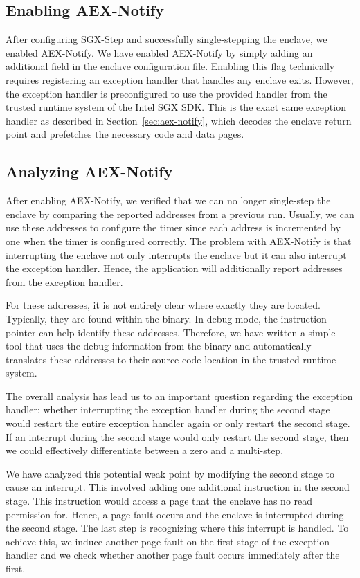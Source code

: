 \documentclass{llncs}
\begin{document}
\subsection{Enabling AEX-Notify}

After configuring SGX-Step and successfully single-stepping the enclave,
we enabled AEX-Notify.
We have enabled AEX-Notify by simply adding an additional field in the enclave configuration file.
Enabling this flag technically requires registering an exception handler that handles any enclave exits.
However, the exception handler is preconfigured to use the provided handler
from the trusted runtime system of the Intel SGX SDK.
This is the exact same exception handler as described in Section~\ref{sec:aex-notify},
which decodes the enclave return point and prefetches the necessary code and data pages.

\subsection{Analyzing AEX-Notify}

After enabling AEX-Notify, we verified that we can no longer single-step the enclave
by comparing the reported addresses from a previous run.
Usually, we can use these addresses to configure the timer
since each address is incremented by one when the timer is configured correctly.
The problem with AEX-Notify is that interrupting the enclave not only
interrupts the enclave but it can also interrupt the exception handler.
Hence, the application will additionally report addresses from the exception handler.

For these addresses, it is not entirely clear where exactly they are located. Typically, they are found within the binary. In debug mode, the instruction pointer can help identify these addresses.
Therefore, we have written a simple tool that uses the debug information from the binary and
automatically translates these addresses to their source code location in the trusted runtime system.

The overall analysis has lead us to an important question regarding the exception handler:
whether interrupting the exception handler during the second stage would
restart the entire exception handler again or only restart the second stage.
If an interrupt during the second stage would only restart the second stage,
then we could effectively differentiate between a zero and a multi-step.

We have analyzed this potential weak point by modifying the second stage to cause an interrupt.
This involved adding one additional instruction in the second stage.
This instruction would access a page that the enclave has no read permission for.
Hence, a page fault occurs and the enclave is interrupted during the second stage.
The last step is recognizing where this interrupt is handled.
To achieve this, we induce another page fault on the first stage of the exception handler
and we check whether another page fault occurs immediately after the first.
\end{document}
